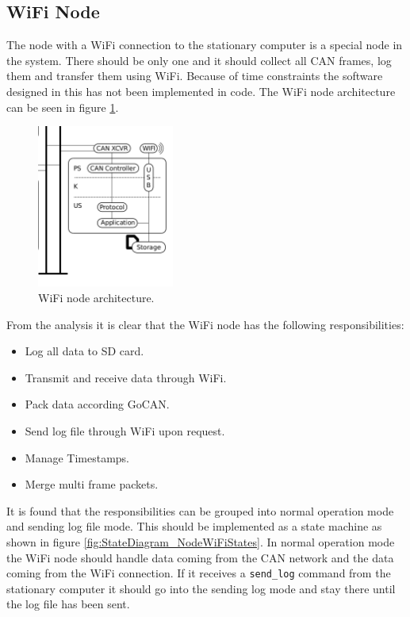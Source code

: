\subsection{WiFi Node}\label{sec:somewifinodesection}
The node with a WiFi connection to the stationary computer is a special node in the system.
There should be only one and it should collect all CAN frames, log them and transfer them using WiFi.
Because of time constraints the software designed in this has not been implemented in code.
The WiFi node architecture can be seen in figure \ref{fig:wifi_node}.

\begin{figure}[!h]
\centering
\includegraphics[width=0.4\textwidth]{graphics/wifi_node}
\caption{WiFi node architecture.}
\label{fig:wifi_node}
\end{figure}

From the analysis it is clear that the WiFi node has the following responsibilities:

\begin{itemize}
\item Log all data to SD card.
\item Transmit and receive data through WiFi.
\item Pack data according GoCAN.
\item Send log file through WiFi upon request.
\item Manage Timestamps.
\item Merge multi frame packets.
\end{itemize}

It is found that the responsibilities can be grouped into normal operation mode and sending log file mode.
This should be implemented as a state machine as shown in figure \ref{fig:StateDiagram_NodeWiFiStates}.
In normal operation mode the WiFi node should handle data coming from the CAN network and the data coming from the WiFi connection.
If it receives a \texttt{send\_log} command from the stationary computer it should go into the sending log mode and stay there until the log file has been sent.\\

